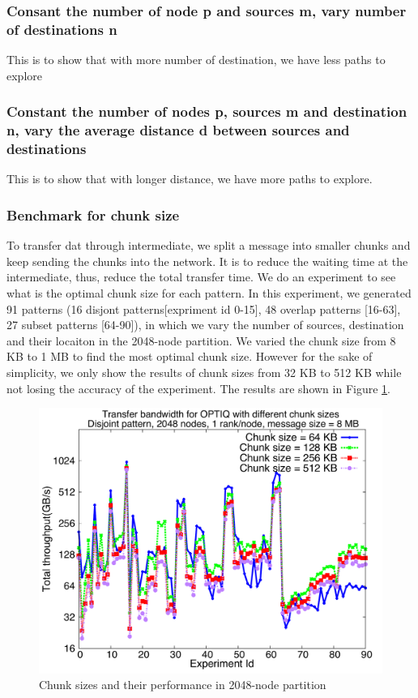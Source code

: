 \subsubsection{Consant the number of node p and sources m, vary number of destinations n}
This is to show that with more number of destination, we have less paths to explore


\subsubsection{Constant the number of nodes p, sources m and destination n, vary the average distance d between sources and destinations}
This is to show that with longer distance, we have more paths to explore.

\subsubsection{Benchmark for chunk size}

To transfer dat through intermediate, we split a message into smaller chunks and keep sending the chunks into the network. It is to reduce the waiting time at the intermediate, thus, reduce the total transfer time. We do an experiment to see what is the optimal chunk size for each pattern. In this experiment, we generated 91 patterns (16 disjont patterns[expriment id 0-15], 48 overlap patterns [16-63], 27 subset patterns [64-90]), in which we vary the number of sources, destination and their locaiton in the 2048-node partition. We varied the chunk size from 8 KB to 1 MB to find the most optimal chunk size. However for the sake of simplicity, we only show the results of chunk sizes from 32 KB to 512 KB while not losing the accuracy of the experiment. The results are shown in Figure \ref{fig:chunksize}.

\begin{figure}[!htb]
\vspace{-0.1in}
\centering
\includegraphics[scale=0.30]{figures/chunksize_2k.pdf}
\vspace{-0.1in}
\caption{Chunk sizes and their performance in 2048-node partition}
\vspace{-0.1in}
\label{fig:chunksize}
\end{figure}

